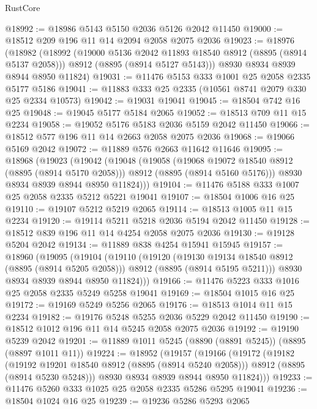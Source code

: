 \begin{lexlean}{RustCore}
\begin{coremodule}
@18992 := @18986 @5143 @5150 @2036 @5126 @2042 @11450
@19000 := @18512 @209 @196 @11 @14 @2094 @2058 @2075 @2036
@19023 := @18976
    (@18982
      (@18992
        (@19000 @5136 @2042 @11893 @18540 @8912 (@8895 (@8914 @5137 @2058)))
        @8912
        (@8895 (@8914 @5127 @5143)))
      @8930
      @8934
      @8939
      @8944
      @8950
      @11824)
@19031 := @11476 @5153 @333 @1001 @25 @2058 @2335 @5177 @5186
@19041 := @11883 @333 @25 @2335 (@10561 @8741 @2079 @330 @25 @2334 @10573)
@19042 := @19031 @19041
@19045 := @18504 @742 @16 @25
@19048 := @19045 @5177 @5184 @2065
@19052 := @18513 @709 @11 @15 @2234
@19058 := @19052 @5176 @5183 @2036 @5159 @2042 @11450
@19066 := @18512 @577 @196 @11 @14 @2663 @2058 @2075 @2036
@19068 := @19066 @5169 @2042
@19072 := @11889 @576 @2663 @11642 @11646
@19095 := @18968
    (@19023
      (@19042
        (@19048
          (@19058
            (@19068 @19072 @18540 @8912 (@8895 (@8914 @5170 @2058)))
            @8912
            (@8895 (@8914 @5160 @5176)))
          @8930
          @8934
          @8939
          @8944
          @8950
          @11824)))
@19104 := @11476 @5188 @333 @1007 @25 @2058 @2335 @5212 @5221 @19041
@19107 := @18504 @1006 @16 @25
@19110 := @19107 @5212 @5219 @2065
@19114 := @18513 @1005 @11 @15 @2234
@19120 := @19114 @5211 @5218 @2036 @5194 @2042 @11450
@19128 := @18512 @839 @196 @11 @14 @4254 @2058 @2075 @2036
@19130 := @19128 @5204 @2042
@19134 := @11889 @838 @4254 @15941 @15945
@19157 := @18960
    (@19095
      (@19104
        (@19110
          (@19120
            (@19130 @19134 @18540 @8912 (@8895 (@8914 @5205 @2058)))
            @8912
            (@8895 (@8914 @5195 @5211)))
          @8930
          @8934
          @8939
          @8944
          @8950
          @11824)))
@19166 := @11476 @5223 @333 @1016 @25 @2058 @2335 @5249 @5258 @19041
@19169 := @18504 @1015 @16 @25
@19172 := @19169 @5249 @5256 @2065
@19176 := @18513 @1014 @11 @15 @2234
@19182 := @19176 @5248 @5255 @2036 @5229 @2042 @11450
@19190 := @18512 @1012 @196 @11 @14 @5245 @2058 @2075 @2036
@19192 := @19190 @5239 @2042
@19201 := @11889 @1011 @5245 (@8890 (@8891 @5245)) (@8895 (@8897 @1011 @11))
@19224 := @18952
    (@19157
      (@19166
        (@19172
          (@19182
            (@19192 @19201 @18540 @8912 (@8895 (@8914 @5240 @2058)))
            @8912
            (@8895 (@8914 @5230 @5248)))
          @8930
          @8934
          @8939
          @8944
          @8950
          @11824)))
@19233 := @11476 @5260 @333 @1025 @25 @2058 @2335 @5286 @5295 @19041
@19236 := @18504 @1024 @16 @25
@19239 := @19236 @5286 @5293 @2065

\end{coremodule}
\end{lexlean}
